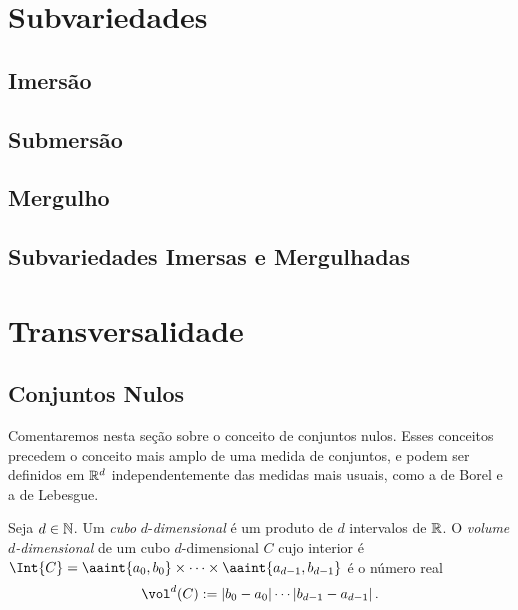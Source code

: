 \section{Subvariedades}

\subsection{Imersão}

\subsection{Submersão}

\subsection{Mergulho}

\subsection{Subvariedades Imersas e Mergulhadas}








\section{Transversalidade}

\subsection{Conjuntos Nulos}

Comentaremos nesta seção sobre o conceito de conjuntos nulos. Esses conceitos precedem o conceito mais amplo de uma medida de conjuntos, e podem ser definidos em $\mathbb{R}^d$ independentemente das medidas mais usuais, como a de Borel e a de Lebesgue.

\begin{defi}
Seja $d \in \mathbb{N}$. Um \emph{cubo} $d$-\emph{dimensional} é um produto de $d$ intervalos de $\mathbb{R}$. O \emph{volume $d$-dimensional} de um cubo $d$-dimensional $C$ cujo interior é $\Int{C} = \aaint{a_0,b_0} \times \cdots \times \aaint{a_{d-1},b_{d-1}}$ é o número real
	\begin{equation*}
	\vol^d(C) := \abs{b_0 - a_0}\cdots\abs{b_{d-1} - a_{d-1}}.
	\end{equation*}
\end{defi}

